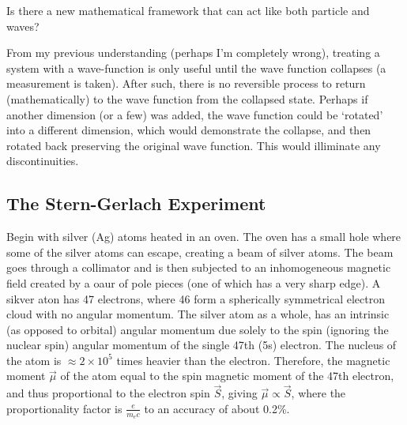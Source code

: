 \begin{questions}
	\item Is there a new mathematical framework that can act like both particle and waves?
 	\item From my previous understanding (perhaps I'm completely wrong), treating a system with a wave-function is only useful until the wave function collapses (a measurement is taken). After such, there is no reversible process to return (mathematically) to the wave function from the collapsed state. Perhaps if another dimension (or a few) was added, the wave function could be `rotated' into a different dimension, which would demonstrate the collapse, and then rotated back preserving the original wave function. This would illiminate any discontinuities.
\end{questions}




\subsection{The Stern-Gerlach Experiment}

Begin with silver (Ag) atoms heated in an oven. The oven has a small hole where some of the silver atoms can escape, creating a beam of silver atoms. The beam goes through a collimator and is then subjected to an inhomogeneous magnetic field created by a oaur of pole pieces (one of which has a very sharp edge). A sikver aton has 47 electrons, where 46 form a spherically symmetrical electron cloud with no angular momentum. The silver atom as a whole, has an intrinsic (as opposed to orbital) angular momentum due solely to the spin (ignoring the nuclear spin) angular momentum of the single 47th (5s) electron. The nucleus of the atom is $\approx 2 \times 10^5$ times heavier than the electron. Therefore, the magnetic moment $\vec{\mu}$ of the atom equal to the spin magnetic moment of the 47th electron, and thus proportional to the electron spin $\vec{S}$, giving $\vec{\mu} \propto \vec{S}$, where the proportionality factor is $\frac{e}{m_ec}$ to an accuracy of about 0.2\%\cite{bib:Modern Quantum Mechanics J.J Sakurai}.

